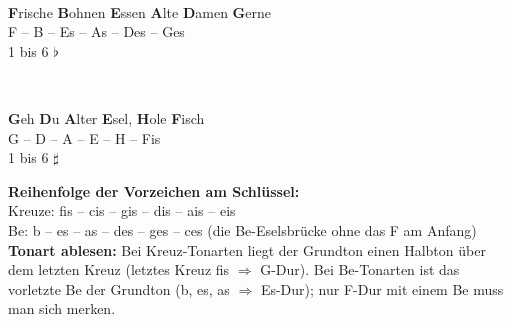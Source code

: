 \vspace{0mm}
\noindent
\begin{minipage}[t]{0.485\linewidth}
\begin{hinweis}\mbox{}\\[2pt]
\raggedright\textbf{F}rische \textbf{B}ohnen \textbf{E}ssen \textbf{A}lte \textbf{D}amen \textbf{G}erne\\[3pt]
F -- B -- Es -- As -- Des -- Ges\\
\small 1 bis 6 \(\flat\)
\end{hinweis}
\end{minipage}\hfill
\begin{minipage}[t]{0.485\linewidth}
\begin{hinweis}\mbox{}\\[2pt]
\raggedright\textbf{G}eh \textbf{D}u \textbf{A}lter \textbf{E}sel, \textbf{H}ole \textbf{F}isch\\[3pt]
G -- D -- A -- E -- H -- Fis\\
\small 1 bis 6 \(\sharp\)
\end{hinweis}
\end{minipage}

\vspace{0mm}
\begin{merke}
\textbf{Reihenfolge der Vorzeichen am Schlüssel:}\\
Kreuze: fis -- cis -- gis -- dis -- ais -- eis\\
Be: b -- es -- as -- des -- ges -- ces \quad(die Be-Eselsbrücke ohne das F am Anfang)\\[3pt]
\textbf{Tonart ablesen:} Bei Kreuz-Tonarten liegt der Grundton einen Halbton über dem
letzten Kreuz (letztes Kreuz fis \(\Rightarrow\) G-Dur). Bei Be-Tonarten ist das
vorletzte Be der Grundton (b, es, as \(\Rightarrow\) Es-Dur); nur F-Dur mit einem Be
muss man sich merken.
\end{merke}


